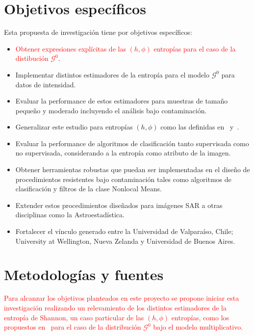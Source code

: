 \documentclass[11pt]{article}
\begin{document}
\section{Objetivos específicos}

Esta propuesta de investigación tiene por objetivos específicos:
\begin{itemize}
	\item \textcolor{red}{Obtener expresiones explícitas de las $(h,\phi)$ entropías para el caso de la distibución $\mathcal{G}^0$}.
	\item Implementar distintos estimadores de la entropía para el modelo $\mathcal{G}^0$ para datos de intensidad.
	\item Evaluar la performance de estos estimadores para muestras de tamaño pequeño y moderado incluyendo el análisis bajo contaminación.
	\item Generalizar este estudio para entropías $(h,\phi)$ como las definidas en~\cite{Menendez1997} y~\cite{Salicru1994}. 
	\item Evaluar la performance de algoritmos de clasificación tanto supervisada como no supervisada, considerando a la entropía como atributo de la imagen.
	\item Obtener herramientas robustas que puedan ser implementadas en el diseño de procedimientos resistentes bajo contaminación tales como algoritmos de clasificación y filtros de la clase Nonlocal Means.
	\item Extender estos procedimientos diseñados para imágenes SAR a otras disciplinas como la Astroestadística.
	\item Fortalecer el vínculo generado entre la Universidad de Valparaíso, Chile; University at Wellington, Nueva Zelanda y Universidad de Buenos Aires.
\end{itemize}

\section{Metodologías y fuentes}

\textcolor{red}{Para alcanzar los objetivos planteados en este proyecto se propone iniciar esta investigación realizando un relevamiento de los distintos estimadores de la entropía de Shannon, un caso particular de las $(h,\phi)$ entropías, como los propuestos en~\cite{Beirlant1997,AlOmari2013,Behmardi2011} para el caso de la distribución $\mathcal{G}^0$ bajo el modelo multiplicativo.}


\end{document}

